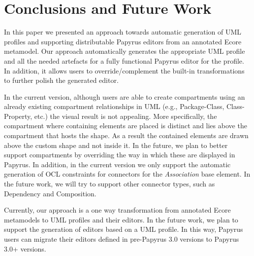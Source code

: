 \section{Conclusions and Future Work}
\label{sec:future}
In this paper we presented an approach towards automatic generation of UML profiles and supporting distributable Papyrus editors from an annotated Ecore metamodel. 
Our approach automatically generates the appropriate UML profile and all the needed artefacts for a fully functional Papyrus editor for the profile. 
In addition, it allows users to override/complement the built-in transformations to further polish the generated editor.

In the current version, although users are able to create compartments using an already existing compartment relationships in UML (e.g., Package-Class, Class-Property, etc.) the visual result is not appealing. 
More specifically, the compartment where containing elements are placed is distinct and lies above the compartment that hosts the shape. 
As a result the contained elements are drawn above the custom shape and not inside it. 
In the future, we plan to better support compartments by overriding the way in which these are displayed in Papyrus. 
In addition, in the current version we only support the automatic generation of OCL constraints for connectors for the \textit{Association} base element.
In the future work, we will try to support other connector types, such as Dependency and Composition. 

Currently, our approach is a one way transformation from annotated Ecore metamodels to UML profiles and their editors. 
In the future work, we plan to support the generation of editors based on a UML profile. 
In this way, Papyrus users can migrate their editors defined in pre-Papyrus 3.0 versions to Papyrus 3.0+ versions.
\\

